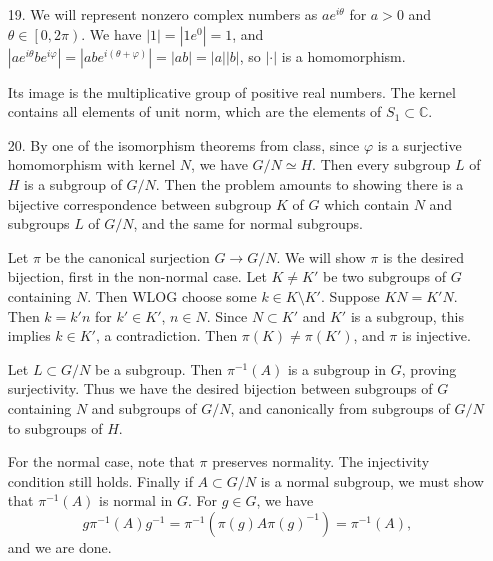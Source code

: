 \documentclass[11pt, reqno]{article}
\theoremstyle{plain}
\theoremstyle{definition}
\theoremstyle{remark}
\renewcommand{\phi}{\varphi}
\newcommand{\CC}{\mathbb{C}}
\begin{document}
\begin{enumerate}
    \item[19.] We will represent nonzero complex numbers as $ae^{i\theta}$ for $a > 0$ and $\theta \in \left[0, 2\pi\right)$.
    We have $|1| = |1e^0| = 1$, and $|ae^{i\theta}be^{i\phi}| = |abe^{i(\theta + \phi)}| = |ab| = |a||b|$,
    so $|\cdot|$ is a homomorphism. 

    Its image is the multiplicative group of positive real numbers. The kernel contains all elements 
    of unit norm, which are the elements of $S_1 \subset \CC$.

    \item[20.] By one of the isomorphism theorems from class, since $\phi$ is a surjective homomorphism
    with kernel $N$, we have $G/N \simeq H$. Then every subgroup $L$ of $H$ is a subgroup of $G/N$.
    Then the problem amounts to showing there is a bijective correspondence between subgroup $K$ of $G$
    which contain $N$ and subgroups $L$ of $G/N$, and the same for normal subgroups. 

    Let $\pi$ be the canonical surjection $G \rightarrow G/N$. We will show $\pi$ is the desired bijection,
    first in the non-normal case. Let $K \neq K'$ be two subgroups of $G$ containing $N$. Then WLOG choose 
    some $k \in K\setminus K'$. Suppose $KN = K'N$. Then $k = k'n$ for $k' \in K'$, $n \in N$. Since 
    $N \subset K'$ and $K'$ is a subgroup, this implies $k \in K'$, a contradiction. Then $\pi(K) \neq \pi(K')$,
    and $\pi$ is injective. 

    Let $L \subset G/N$ be a subgroup. Then $\pi^{-1}(A)$ is a subgroup in $G$, proving surjectivity. Thus 
    we have the desired bijection between subgroups of $G$ containing $N$ and subgroups of $G/N$, and canonically
    from subgroups of $G/N$ to subgroups of $H$. 

    For the normal case, note that $\pi$ preserves normality. The injectivity condition still holds. 
    Finally if $A \subset G/N$ is a normal subgroup, we must show that $\pi^{-1}(A)$ is normal in $G$. For
    $g \in G$, we have 
    \[
        g\pi^{-1}(A) g^{-1} = \pi^{-1}(\pi(g)A \pi(g)^{-1}) = \pi^{-1}(A),
    \]
    and we are done. 

\end{enumerate}
\end{document}
